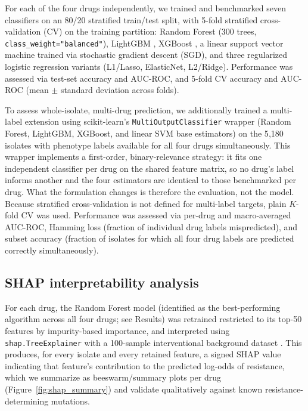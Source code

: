 For each of the four drugs independently, we trained and benchmarked seven classifiers on an 80/20 stratified train/test split, with 5-fold stratified cross-validation (CV) on the training partition: Random Forest \cite{breiman2001random} (300 trees, \texttt{class\_weight="balanced"}), LightGBM \cite{ke2017lightgbm}, XGBoost \cite{chen2016xgboost}, a linear support vector machine trained via stochastic gradient descent (SGD), and three regularized logistic regression variants (L1/Lasso, ElasticNet, L2/Ridge). Performance was assessed via test-set accuracy and AUC-ROC, and 5-fold CV accuracy and AUC-ROC (mean $\pm$ standard deviation across folds).

To assess whole-isolate, multi-drug prediction, we additionally trained a multi-label extension using scikit-learn's \texttt{MultiOutputClassifier} wrapper (Random Forest, LightGBM, XGBoost, and linear SVM base estimators) on the 5{,}180 isolates with phenotype labels available for all four drugs simultaneously. This wrapper implements a first-order, binary-relevance strategy: it fits one independent classifier per drug on the shared feature matrix, so no drug's label informs another and the four estimators are identical to those benchmarked per drug. What the formulation changes is therefore the evaluation, not the model. Because stratified cross-validation is not defined for multi-label targets, plain $K$-fold CV was used. Performance was assessed via per-drug and macro-averaged AUC-ROC, Hamming loss (fraction of individual drug labels mispredicted), and subset accuracy (fraction of isolates for which all four drug labels are predicted correctly simultaneously).

\subsection{SHAP interpretability analysis}

For each drug, the Random Forest model (identified as the best-performing algorithm across all four drugs; see Results) was retrained restricted to its top-50 features by impurity-based importance, and interpreted using \texttt{shap.TreeExplainer} with a 100-sample interventional background dataset \cite{lundberg2017unified}. This produces, for every isolate and every retained feature, a signed SHAP value indicating that feature's contribution to the predicted log-odds of resistance, which we summarize as beeswarm/summary plots per drug (Figure~\ref{fig:shap_summary}) and validate qualitatively against known resistance-determining mutations.

